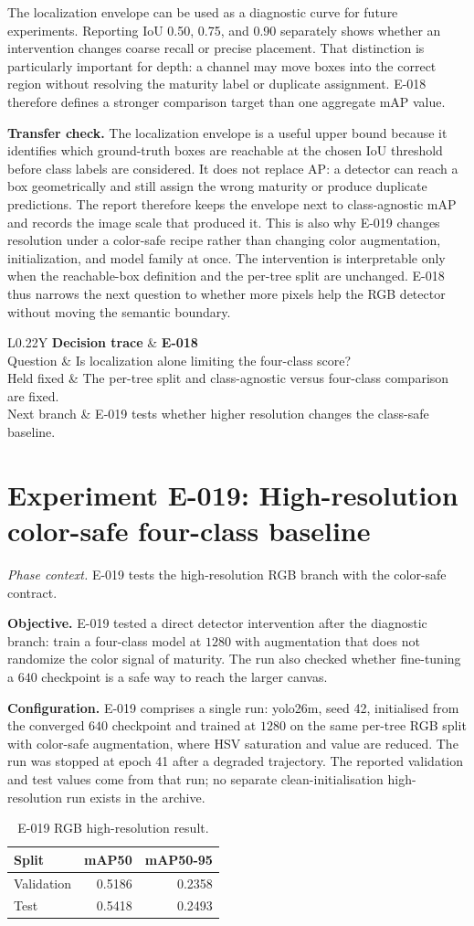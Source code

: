 \documentclass[preprint,12pt]{elsarticle}
\newcommand{\experiment}[2]{\par\medskip\Needspace{7\baselineskip}\section{Experiment #1: #2}}
\newcommand{\decisioncard}[4]{%
\begin{table}[H]\centering\small
\begin{tabularx}{\columnwidth}{L{0.22\columnwidth}Y}
\toprule
\textbf{Decision trace} & \textbf{#1}\\
Question & #2\\
Held fixed & #3\\
Next branch & #4\\
\bottomrule
\end{tabularx}
\end{table}}
\newcommand{\phasecontext}[1]{%
\par\smallskip\noindent\textit{Phase context.} #1\par\smallskip}
\begin{document}
The localization envelope can be used as a diagnostic curve for future
experiments. Reporting IoU 0.50, 0.75, and 0.90 separately shows whether an
intervention changes coarse recall or precise placement. That distinction is
particularly important for depth: a channel may move boxes into the correct
region without resolving the maturity label or duplicate assignment. E-018
therefore defines a stronger comparison target than one aggregate mAP value.

\textbf{Transfer check.} The localization envelope is a useful upper bound
because it identifies which ground-truth boxes are reachable at the chosen
IoU threshold before class labels are considered. It does not replace AP: a
detector can reach a box geometrically and still assign the wrong maturity or
produce duplicate predictions. The report therefore keeps the envelope next
to class-agnostic mAP and records the image scale that produced it. This is
also why E-019 changes resolution under a color-safe recipe rather than
changing color augmentation, initialization, and model family at once. The
intervention is interpretable only when the reachable-box definition and the
per-tree split are unchanged. E-018 thus narrows the next question to whether
more pixels help the RGB detector without moving the semantic boundary.

\decisioncard{E-018}{Is localization alone limiting the four-class score?}{The per-tree split and class-agnostic versus four-class comparison are fixed.}{E-019 tests whether higher resolution changes the class-safe baseline.}
\experiment{E-019}{High-resolution color-safe four-class baseline}
\phasecontext{E-019 tests the high-resolution RGB branch with the color-safe contract.}
\textbf{Objective.} E-019 tested a direct detector intervention after the
diagnostic branch: train a four-class model at \(1280\) with augmentation that
does not randomize the color signal of maturity. The run also checked whether
fine-tuning a \(640\) checkpoint is a safe way to reach the larger canvas.

\textbf{Configuration.} E-019 comprises a single run: yolo26m, seed 42,
initialised from the converged \(640\) checkpoint and trained at \(1280\) on
the same per-tree RGB split with color-safe augmentation, where HSV saturation
and value are reduced. The run was stopped at epoch 41 after a degraded
trajectory. The reported validation and test values come from that run; no
separate clean-initialisation high-resolution run exists in the archive.

\begin{table}[H]
\centering
\caption{E-019 RGB high-resolution result.}
\label{tab:e019}
\begin{tabular}{lrr}
\toprule
Split & mAP50 & mAP50-95\\
\midrule
Validation & 0.5186 & 0.2358\\
Test & 0.5418 & 0.2493\\
\bottomrule
\end{tabular}
\end{table}
\end{document}

